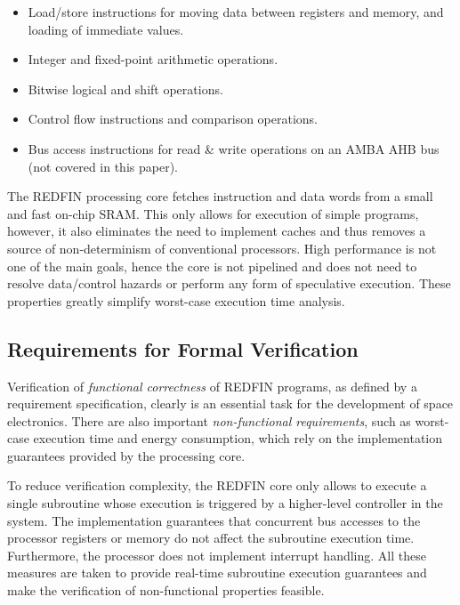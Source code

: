 \begin{itemize}
\item{Load/store instructions for moving data between registers and memory, and
loading of immediate values.}
\item{Integer and fixed-point arithmetic operations.}
\item{Bitwise logical and shift operations.}
\item{Control flow instructions and comparison operations.}
\item{Bus access instructions for read \& write operations on an AMBA AHB bus
(not covered in this paper).}
\end{itemize}

The REDFIN processing core fetches instruction and data words from a small and fast
on-chip SRAM. This only allows for execution of simple programs, however, it also
eliminates the need to implement caches and thus removes a source of non-determinism of
conventional processors. High performance is not one of the main goals, hence the
core is not pipelined and does not need to resolve data/control hazards or
perform any form of speculative execution. These properties greatly simplify
worst-case execution time analysis.

\subsection{Requirements for Formal Verification}

Verification of \emph{functional correctness} of REDFIN programs, as defined by a
requirement specification, clearly is an essential task for the development of space
electronics. There are also important \emph{non-functional requirements}, such as
worst-case execution time and energy consumption, which rely on the implementation
guarantees provided by the processing core.

To reduce verification complexity,
the REDFIN core only allows to execute a single subroutine whose execution is triggered
by a higher-level controller in the system. The implementation guarantees that
concurrent bus accesses to the processor registers or memory do not affect
the subroutine execution time. Furthermore, the processor does not implement
interrupt handling. All these measures are taken to provide real-time
subroutine execution guarantees and make the verification of non-functional
properties feasible. %

